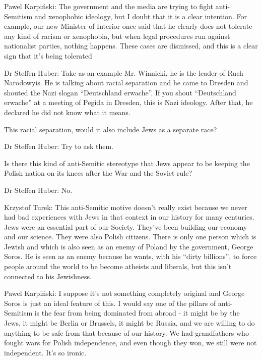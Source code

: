 Pawel Karpiński: The government and the media are trying to fight anti-Semitism and xenophobic ideology, but I doubt that it is a clear intention. For example, our new Minister of Interior once said that he clearly does not tolerate any kind of racism or xenophobia, but when legal procedures run against nationalist parties, nothing happens. These cases are dismissed, and this is a clear sign that it’s being tolerated 

Dr Steffen Huber: Take as an example Mr. Winnicki, he is the leader of Ruch Narodowyis. He is talking about racial separation and he came to Dresden and shouted the Nazi slogan “Deutschland erwache”. If you shout “Deutschland erwache” at a meeting of Pegida in Dresden, this is Nazi ideology. After that, he declared he did not know what it means.  

 

This racial separation, would it also include Jews as a separate race? 

 

Dr Steffen Huber: Try to ask them.  

 

Is there this kind of anti-Semitic stereotype that Jews appear to be keeping the Polish nation on its knees after the War and the Soviet rule? 

 

Dr Steffen Huber: No. 

Krzystof Turek: This anti-Semitic motive doesn’t really exist because we never had bad experiences with Jews in that context in our history for many centuries. Jews were an essential part of our Society. They've been building our economy and our science. They were also Polish citizens. There is only one person which is Jewish and which is also seen as an enemy of Poland by the government, George Soros. He is seen as an enemy because he wants, with his “dirty billions”, to force people around the world to be become atheists and liberals, but this isn’t connected to his Jewishness. 

Pawel Karpiński: I suppose it's not something completely original and George Soros is just an ideal feature of this. I would say one of the pillars of anti-Semitism is the fear from being dominated from abroad - it might be by the Jews, it might be Berlin or Brussels, it might be Russia, and we are willing to do anything to be safe from that because of our history. We had grandfathers who fought wars for Polish independence, and even though they won, we still were not independent. It's so ironic.  

